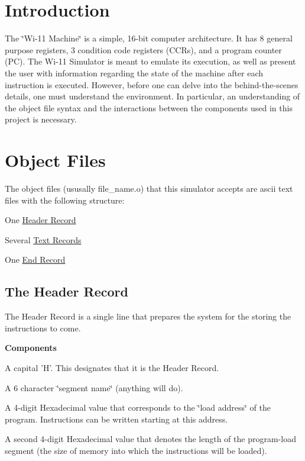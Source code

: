 \hypertarget{index_intro}{}\section{Introduction}\label{index_intro}
The \char`\"{}Wi-\/11 Machine\char`\"{} is a simple, 16-\/bit computer architecture. It has 8 general purpose registers, 3 condition code registers (CCRs), and a program counter (PC). The Wi-\/11 Simulator is meant to emulate its execution, as well as present the user with information regarding the state of the machine after each instruction is executed. However, before one can delve into the behind-\/the-\/scenes details, one must understand the environment. In particular, an understanding of the object file syntax and the interactions between the components used in this project is necessary.\hypertarget{index_syntax}{}\section{Object Files}\label{index_syntax}
\begin{DoxyParagraph}{}
The object files (ususally file\_\-name.o) that this simulator accepts are ascii text files with the following structure: \begin{DoxyItemize}
\item One \hyperlink{index_header}{Header Record} \item Several \hyperlink{index_text}{Text Records} \item One \hyperlink{index_end}{End Record}\end{DoxyItemize}

\end{DoxyParagraph}
\hypertarget{index_header}{}\subsection{The Header Record}\label{index_header}
\begin{DoxyParagraph}{}
The Header Record is a single line that prepares the system for the storing the instructions to come. 
\end{DoxyParagraph}
\begin{DoxyParagraph}{}
{\bfseries Components} \begin{DoxyItemize}
\item A capital 'H'. This designates that it is the Header Record. \item A 6 character \char`\"{}segment name\char`\"{} (anything will do). \item A 4-\/digit Hexadecimal value that corresponds to the \char`\"{}load address\char`\"{} of the program. Instructions can be written starting at this address. \item A second 4-\/digit Hexadecimal value that denotes the length of the program-\/load segment (the size of memory into which the instructions will be loaded). \end{DoxyItemize}

\end{DoxyParagraph}
